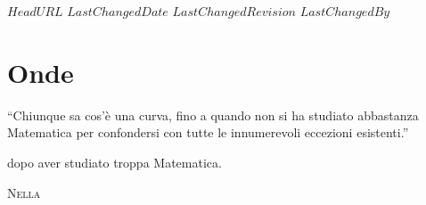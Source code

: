\svnidlong
{$HeadURL$}
{$LastChangedDate$}
{$LastChangedRevision$}
{$LastChangedBy$}

\chapter{Onde}

\begin{introduction}
	``Chiunque sa cos'è una curva, fino a quando non si ha studiato abbastanza Matematica per confondersi con tutte le innumerevoli eccezioni esistenti.''
	\begin{flushright}
		 dopo aver studiato troppa Matematica. %
	\end{flushright}
\end{introduction}
\lettrine[findent=1pt, nindent=0pt]{N}{ella} %









